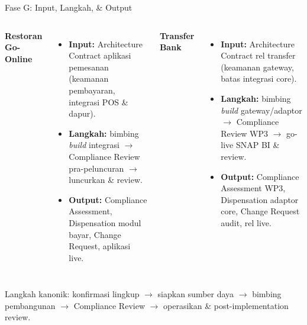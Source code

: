 \documentclass[aspectratio=169, table]{beamer}
\newcommand{\takeaway}[1]{%
  \vspace{4pt}
  {\footnotesize #1}
}
\begin{document}
\begin{frame}{Fase G: Input, Langkah, \& Output}
  \vspace{2pt}
  \small
  \begin{columns}[t]
    \textbf{\textcolor{praditagreen}{Restoran Go-Online}}
    \begin{itemize}\setlength{\itemsep}{2pt}
      \item \textbf{Input:} Architecture Contract aplikasi pemesanan (keamanan
            pembayaran, integrasi POS \& dapur).
      \item \textbf{Langkah:} bimbing \emph{build} integrasi $\rightarrow$
            Compliance Review pra-peluncuran $\rightarrow$ luncurkan \& review.
      \item \textbf{Output:} Compliance Assessment, Dispensation modul bayar,
            Change Request, aplikasi live.
    \end{itemize}
    \textbf{\textcolor{blueColor}{Transfer Bank}}
    \begin{itemize}\setlength{\itemsep}{2pt}
      \item \textbf{Input:} Architecture Contract rel transfer (keamanan gateway,
            batas integrasi core).
      \item \textbf{Langkah:} bimbing \emph{build} gateway/adaptor $\rightarrow$
            Compliance Review WP3 $\rightarrow$ go-live SNAP BI \& review.
      \item \textbf{Output:} Compliance Assessment WP3, Dispensation adaptor core,
            Change Request audit, rel live.
    \end{itemize}
  \end{columns}
  \takeaway{Langkah kanonik: konfirmasi lingkup $\rightarrow$ siapkan sumber daya
  $\rightarrow$ bimbing pembangunan $\rightarrow$ Compliance Review $\rightarrow$
  operasikan \& post-implementation review.}
\end{frame}
\end{document}
